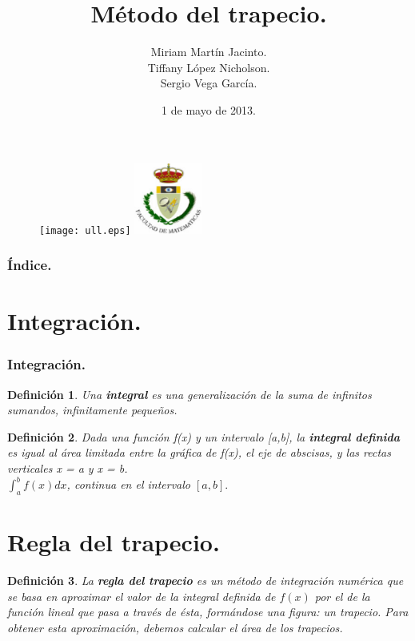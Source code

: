 \documentclass{beamer}
\title[Integración]{Método del trapecio.}
\author[Grupo-2D]{Miriam Martín Jacinto.\\Tiffany López Nicholson.\\Sergio Vega García.}
\date[01/05/2013]{1 de mayo de 2013.}
\newtheorem{definicion}{Definición}
\begin{document}
  \begin{frame}
    \begin{figure}[lt]
      	\texttt{[image: ull.eps]}
      	\hspace{5.5cm}
		\includegraphics[width=0.2\textwidth]{fmatesc.eps}
    \end{figure}
    \titlepage
  \end{frame}
  \begin{frame}
    \frametitle{Índice.}
    \tableofcontents[pausesections]
  \end{frame}
  \section{Integración.}
  \begin{frame}
    \frametitle{Integración.}
      \begin{definicion}
	Una \textbf{integral} es una generalización de la suma de infinitos sumandos, infinitamente pequeños.
      \end{definicion}
	
      \begin{definicion}
	Dada una función f(x) y un intervalo [a,b], la \textbf{integral definida} es igual al área limitada entre la gráfica de f(x), el eje de abscisas, y las rectas verticales x = a y x = b.\\
	$\int_{a}^{b} f(x) dx$, continua en el intervalo $[a, b].$
      \end{definicion}
  \end{frame}
  \section{Regla del trapecio.}
  \begin{frame}
    \begin{definicion}
      La \textbf{regla del trapecio} es un método de integración numérica que se basa en aproximar el valor de la integral definida de $f(x)$ por el de la función lineal que pasa a través de ésta, formándose una figura: un trapecio. Para obtener esta aproximación, debemos calcular el área de los trapecios.
    \end{definicion}
  \end{frame}
\end{document}
